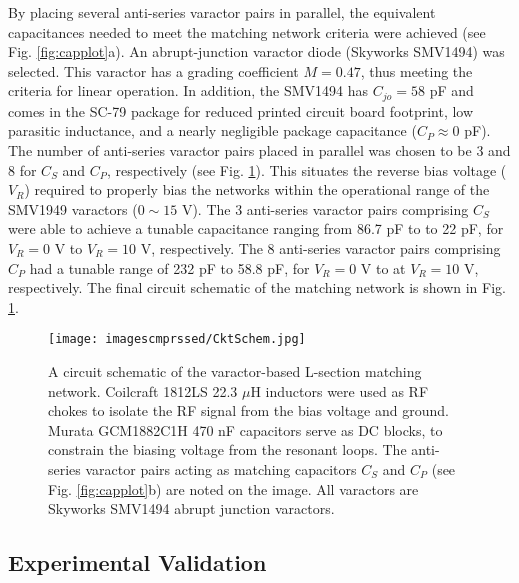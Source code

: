 \documentclass[journal]{IEEEtran}
\begin{document}
By placing several anti-series varactor pairs in parallel, the equivalent capacitances needed to meet the matching network criteria were achieved (see Fig. \ref{fig:capplot}a). An abrupt-junction varactor diode (Skyworks SMV1494) was selected. This varactor has a grading coefficient $M=0.47$, thus meeting the criteria for linear operation. In addition, the SMV1494 has $C_{jo}=58$ pF and comes in the SC-79 package for reduced printed circuit board footprint, low parasitic inductance, and a nearly negligible package capacitance ($C_P\approx0$ pF). The number of anti-series varactor pairs placed in parallel was chosen to be 3 and 8 for $C_S$ and $C_P$, respectively (see Fig. \ref{fig:CktSchem}). This situates the reverse bias voltage ($V_R$) required to properly bias the networks within the operational range of the SMV1949 varactors ($0\sim15 $ V). The 3 anti-series varactor pairs comprising $C_S$ were able to achieve a tunable capacitance ranging from 86.7 pF to  to 22 pF, for $V_R=0$ V to $V_R=10$ V, respectively. The 8 anti-series varactor pairs comprising $C_P$ had a tunable range of 232 pF to 58.8 pF, for $V_R=0$ V to  at $V_R=10$ V, respectively. The final circuit schematic of the matching network is shown in Fig. \ref{fig:CktSchem}.
\begin{figure}[htbp]
    \centering
    \texttt{[image: imagescmprssed/CktSchem.jpg]}
    \caption{A circuit schematic of the varactor-based L-section matching network. Coilcraft 1812LS 22.3 $\mu$H inductors were used as RF chokes to isolate the RF signal from the bias voltage and ground. Murata GCM1882C1H 470 nF capacitors serve as DC blocks, to constrain the biasing voltage from the resonant loops. The anti-series varactor pairs acting as matching capacitors $C_S$ and $C_P$ (see Fig. \ref{fig:capplot}b) are noted on the image. All varactors are Skyworks SMV1494 abrupt junction varactors.}
    \label{fig:CktSchem}
\end{figure}

\subsection{Experimental Validation}
\label{sec:ExpResults}
\end{document}
